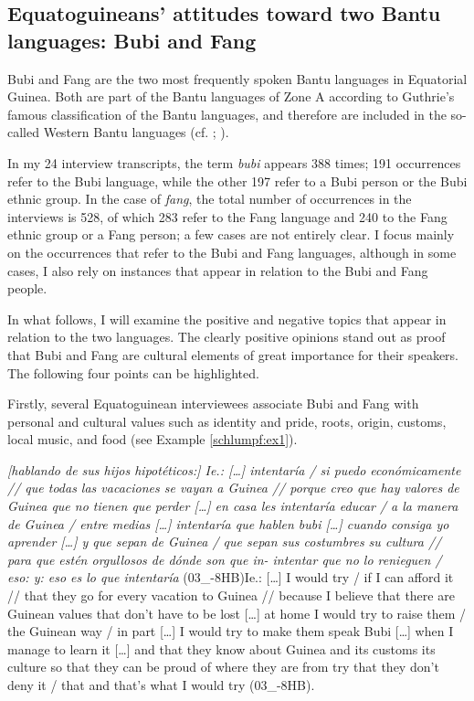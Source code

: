 \documentclass[output=paper]{langscibook}
\begin{document}
\subsection{Equatoguineans’ attitudes toward two Bantu languages: Bubi and Fang}\label{schlumpf:sec:attitudes}

Bubi and Fang are the two most frequently spoken Bantu languages in Equatorial Guinea. Both are part of the Bantu languages of Zone A according to Guthrie’s famous classification of the Bantu languages, and therefore are included in the so-called Western Bantu languages (cf. \citealt{guthrie_bantu_1953}; \citeyear{guthrie_western_1971}).

In my 24 interview transcripts, the term \textit{bubi} appears 388 times; 191 occurrences refer to the Bubi language, while the other 197 refer to a Bubi person or the Bubi ethnic group. In the case of \textit{fang}, the total number of occurrences in the interviews is 528, of which 283 refer to the Fang language and 240 to the Fang ethnic group or a Fang person; a few cases are not entirely clear. I focus mainly on the occurrences that refer to the Bubi and Fang languages, although in some cases, I also rely on instances that appear in relation to the Bubi and Fang people.

In what follows, I will examine the positive and negative topics that appear in relation to the two languages. The clearly positive opinions stand out as proof that Bubi and Fang are cultural elements of great importance for their speakers. The following four points can be highlighted.

Firstly, several Equatoguinean interviewees associate Bubi and Fang with personal and cultural values such as identity and pride, roots, origin, customs, local music, and food (see Example \ref{schlumpf:ex1}).

\begin{exe}\ex\label{schlumpf:ex1}
	\textit{[hablando de sus hijos hipotéticos:] Ie.: […] intentaría / si puedo económicamente // que todas las vacaciones se vayan a Guinea // porque creo que hay valores de Guinea que no tienen que perder […] en casa les intentaría educar / a la manera de Guinea / entre medias […] intentaría que hablen bubi […] cuando consiga yo aprender […] y que sepan de Guinea / que sepan sus costumbres su cultura // para que estén orgullosos de dónde son que in- intentar que no lo renieguen / eso: y: eso es lo que intentaría} (03\_-8HB) Ie.: […] I would try / if I can afford it // that they go for every vacation to Guinea // because I believe that there are Guinean values that don’t have to be lost […] at home I would try to raise them / the Guinean way / in part […] I would try to make them speak Bubi […] when I manage to learn it […] and that they know about Guinea and its customs its culture so that they can be proud of where they are from try that they don’t deny it / that and that’s what I would try (03\_-8HB).
\end{exe}
\end{document}

